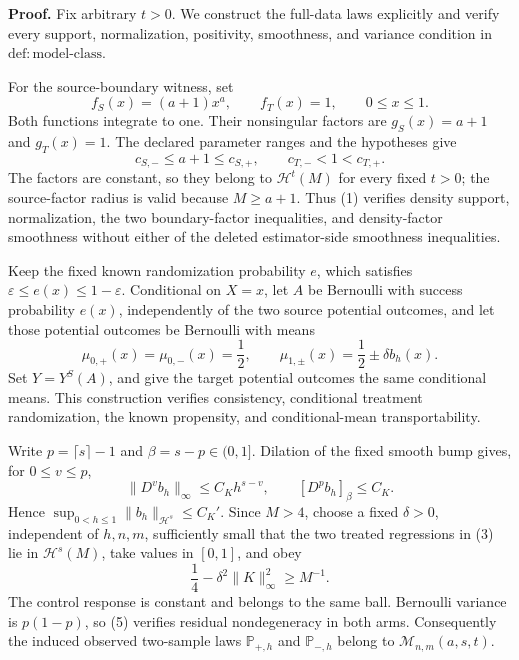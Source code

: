 \textbf{Proof.}
Fix arbitrary \(t>0\).  We construct the full-data laws explicitly and verify every support, normalization, positivity, smoothness, and variance condition in \(\mathrm{def:model\text{-}class}\).

For the source-boundary witness, set
\[
 f_S(x)=(a+1)x^a,
 \qquad
 f_T(x)=1,
 \qquad 0\le x\le1.
\tag{1}
\]
Both functions integrate to one.  Their nonsingular factors are
\(g_S(x)=a+1\) and \(g_T(x)=1\).  The declared parameter ranges and the hypotheses give
\[
 c_{S,-}\le a+1\le c_{S,+},
 \qquad
 c_{T,-}<1<c_{T,+}.
\tag{2}
\]
The factors are constant, so they belong to \(\mathcal H^t(M)\) for every fixed \(t>0\); the source-factor radius is valid because \(M\ge a+1\).  Thus (1) verifies density support, normalization, the two boundary-factor inequalities, and density-factor smoothness without either of the deleted estimator-side smoothness inequalities.

Keep the fixed known randomization probability \(e\), which satisfies
\(\varepsilon\le e(x)\le1-\varepsilon\).  Conditional on \(X=x\), let \(A\) be Bernoulli with success probability \(e(x)\), independently of the two source potential outcomes, and let those potential outcomes be Bernoulli with means
\[
 \mu_{0,+}(x)=\mu_{0,-}(x)=\frac12,
 \qquad
 \mu_{1,\pm}(x)=\frac12\pm\delta b_h(x).
\tag{3}
\]
Set \(Y=Y^S(A)\), and give the target potential outcomes the same conditional means.  This construction verifies consistency, conditional treatment randomization, the known propensity, and conditional-mean transportability.

Write \(p=\lceil s\rceil-1\) and \(\beta=s-p\in(0,1]\).  Dilation of the fixed smooth bump gives, for \(0\le v\le p\),
\[
 \lVert D^v b_h\rVert_\infty\le C_Kh^{s-v},
 \qquad
 [D^p b_h]_{\beta}\le C_K.
\tag{4}
\]
Hence \(\sup_{0<h\le1}\lVert b_h\rVert_{\mathcal H^s}\le C_K'\).  Since \(M>4\), choose a fixed \(\delta>0\), independent of \(h,n,m\), sufficiently small that the two treated regressions in (3) lie in \(\mathcal H^s(M)\), take values in \([0,1]\), and obey
\[
 \frac14-\delta^2\lVert K\rVert_\infty^2\ge M^{-1}.
\tag{5}
\]
The control response is constant and belongs to the same ball.  Bernoulli variance is \(p(1-p)\), so (5) verifies residual nondegeneracy in both arms.  Consequently the induced observed two-sample laws \(\mathbb P_{+,h}\) and \(\mathbb P_{-,h}\) belong to \(\mathcal M_{n,m}(a,s,t)\).

